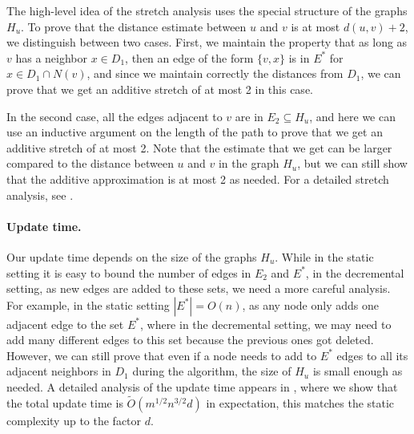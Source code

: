 The high-level idea of the stretch analysis uses the special structure of the graphs $H_u$. To prove that the distance estimate between $u$ and $v$ is at most $d(u,v)+2$, we distinguish between two cases. First, we maintain the property that as long as $v$ has a neighbor $x \in D_1$, then an edge of the form $\{v,x\}$ is in $E^*$ for $x \in D_1 \cap N(v)$, and since we maintain correctly the distances from $D_1$, we can prove that we get an additive stretch of at most 2 in this case. 

In the second case, all the edges adjacent to $v$ are in $E_2 \subseteq H_u$, and here we can use an inductive argument on the length of the path to prove that we get an additive stretch of at most 2. Note that the estimate that we get can be larger compared to the distance between $u$ and $v$ in the graph $H_u$, but we can still show that the additive approximation is at most 2 as needed. For a detailed stretch analysis, see .

\paragraph{Update time.}

Our update time depends on the size of the graphs $H_u$. While in the static setting it is easy to bound the number of edges in $E_2$ and $E^*$, in the decremental setting, as new edges are added to these sets, we need a more careful analysis. For example, in the static setting $|E^*|=O(n)$, as any node only adds one adjacent edge to the set $E^*$, where in the decremental setting, we may need to add many different edges to this set because the previous ones got deleted. However, we can still prove that even if a node needs to add to $E^*$ edges to all its adjacent neighbors in $D_1$ during the algorithm, the size of $H_u$ is small enough as needed. A detailed analysis of the update time appears in , where we show that the total update time is $\tilde{O}(m^{1/2}n^{3/2}d)$ in expectation, this matches the static complexity up to the factor $d$.

